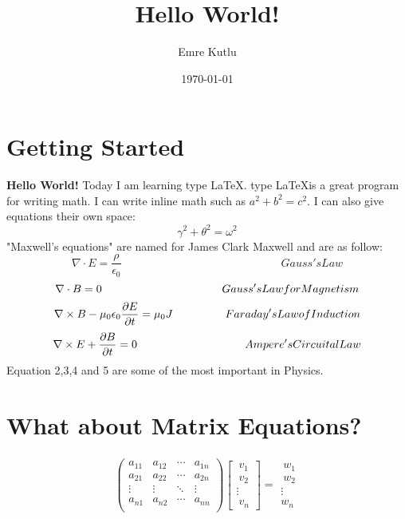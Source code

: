 \documentclass{article}
\title{Hello World!}
\author{Emre Kutlu }
\date{\today}
\begin{document}
\maketitle

\section{Getting Started}
\textbf{Hello World!} Today I am learning type \LaTeX . type \LaTeX is a great program for writing math. I can write inline math such as $a^2+b^2=c^2$. I can also give equations their own space:
\begin{equation}
\gamma^2+\theta^2=\omega^2 
\end{equation}
"Maxwell's equations" are named for James Clark Maxwell and are as follow:
\begin{equation}
\nabla \cdot E = \frac{\rho}{\epsilon_0} 
\hspace{6cm}Gauss's Law
\end{equation}
\begin{equation}
\nabla \cdot B = 0 
\hspace{3.8cm} Gauss's Law for Magnetism
\end{equation}
\begin{equation}
\nabla \times B - \mu_0 \epsilon_0 \frac{\partial E}{\partial t} = \mu_0 J 
\hspace{1.65cm}Faraday's Law of Induction
\end{equation}
\begin{equation}
\nabla \times E + \frac{\partial B}{\partial t} = 0 
\hspace{3.4cm}Ampere's Circuital Law
\end{equation}
Equation 2,3,4 and 5 are some of the most important in Physics.
\section{What about Matrix Equations?}

\begin{gather*}  \begin{pmatrix}
    a_{11} &  a_{12} & \cdots & a_{1n}\\
    a_{21} &  a_{22} & \cdots & a_{2n}\\
    \vdots & \vdots & \ddots & \vdots \\
    a_{n1} &  a_{n2} & \cdots & a_{nn}\\
\end{pmatrix}\begin{bmatrix}
\ v_{1} \\ 
\ v_{2} \\ 
\vdots \\ 
\ v_{n}
\end{bmatrix} = \begin{matrix}
\ w_{1} \\ 
\ w_{2} \\ 
\vdots \\ 
w_{n}
\end{matrix}
\end{gather*}
\end{document}
